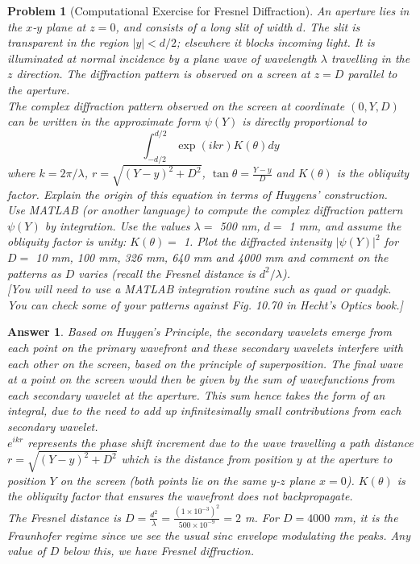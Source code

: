 \documentclass[a4paper]{article}
\newtheorem{ans}{Answer}[section]
\theoremstyle{new}
\newtheorem{qns}{Problem}[section]
\begin{document}
\begin{qns}
[Computational Exercise for Fresnel Diffraction]
An aperture lies in the $x$-$y$ plane at $z = 0$, and consists of a long slit of width $d$. The slit is transparent in the region $|y|<d/2$; elsewhere it blocks incoming light. It is illuminated at normal incidence by a plane wave of wavelength $\lambda$ travelling in the $z$ direction. The diffraction pattern is observed on a screen at $z=D$ parallel to the aperture.\\[5pt]
The complex diffraction pattern observed on the screen at coordinate $(0,Y,D)$ can be written in the approximate form $\psi(Y)$ is directly proportional to
$$\int_{-d/2}^{d/2}\exp(ikr)K(\theta)dy$$
where $k=2\pi/\lambda$, $r=\sqrt{(Y-y)^2+D^2}$, $\tan\theta=\frac{Y-y}{D}$ and $K(\theta)$ is the obliquity factor. Explain the origin of this equation in terms of Huygens’ construction.\\[5pt]
Use MATLAB (or another language) to compute the complex diffraction pattern $\psi(Y)$ by integration.
Use the values $\lambda =$ 500 nm, $d =$ 1 mm, and assume the obliquity factor is unity: $K(\theta)=$ 1. Plot the diffracted intensity $|\psi(Y)|^2$ for $D=$ 10 mm, 100 mm, 326 mm, 640 mm and 4000 mm and comment on the patterns as $D$ varies (recall the Fresnel distance is $d^2/\lambda$).\\[5pt]
[You will need to use a MATLAB integration routine such as quad or quadgk. You can check some of your patterns against Fig. 10.70 in Hecht’s Optics book.]
\end{qns}
\begin{ans}
Based on Huygen's Principle, the secondary wavelets emerge from each point on the primary wavefront and these secondary wavelets interfere with each other on the screen, based on the principle of superposition. The final wave at a point on the screen would then be given by the sum of wavefunctions from each secondary wavelet at the aperture. This sum hence takes the form of an integral, due to the need to add up infinitesimally small contributions from each secondary wavelet.\\[5pt]
$e^{ikr}$ represents the phase shift increment due to the wave travelling a path distance $r=\sqrt{(Y-y)^2+D^2}$ which is the distance from position $y$ at the aperture to position $Y$ on the screen (both points lie on the same $y$-$z$ plane $x=0$). $K(\theta)$ is the obliquity factor that ensures the wavefront does not backpropagate.\\[5pt]
The Fresnel distance is $D=\frac{d^2}{\lambda}=\frac{(1\times10^{-3})^2}{500\times10^{-9}}=2$ m. For $D=4000$ mm, it is the Fraunhofer regime since we see the usual sinc envelope modulating the peaks. Any value of $D$ below this, we have Fresnel diffraction.
\end{ans}
\end{document}
